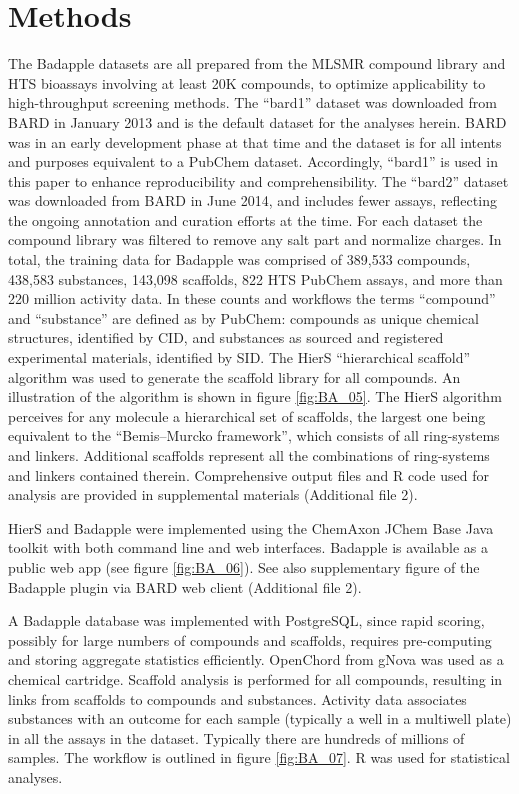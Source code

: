 \section{Methods}

The Badapple datasets are all prepared from the MLSMR compound library and HTS bioassays involving at least 20K compounds, to optimize applicability to high-throughput screening methods. The “bard1” dataset was downloaded from BARD in January 2013 and is the default dataset for the analyses herein. BARD was in an early development phase at that time and the dataset is for all intents and purposes equivalent to a PubChem dataset. Accordingly, “bard1” is used in this paper to enhance reproducibility and comprehensibility. The “bard2” dataset was downloaded from BARD in June 2014, and includes fewer assays, reflecting the ongoing annotation and curation efforts at the time. For each dataset the compound library was filtered to remove any salt part and normalize charges. In total, the training data for Badapple was comprised of 389,533 compounds, 438,583 substances, 143,098 scaffolds, 822 HTS PubChem assays, and more than 220 million activity data. In these counts and workflows the terms “compound” and “substance” are defined as by PubChem: compounds as unique chemical structures, identified by CID, and substances as sourced and registered experimental materials, identified by SID. The HierS “hierarchical scaffold” algorithm was used to generate the scaffold library for all compounds. An illustration of the algorithm is shown in figure \ref{fig:BA_05}. The HierS algorithm perceives for any molecule a hierarchical set of scaffolds, the largest one being equivalent to the “Bemis–Murcko framework”\cite{Bemis1996-jg}, which consists of all ring-systems and linkers. Additional scaffolds represent all the combinations of ring-systems and linkers contained therein. Comprehensive output files and R code used for analysis are provided in supplemental materials (Additional file 2).

HierS and Badapple were implemented using the ChemAxon JChem Base Java toolkit\cite{ChemAxon2012-py} with both command line and web interfaces. Badapple is available as a public web app (see figure \ref{fig:BA_06}). See also supplementary figure of the Badapple plugin via BARD web client (Additional file 2).

A Badapple database was implemented with PostgreSQL, since rapid scoring, possibly for large numbers of compounds and scaffolds, requires pre-computing and storing aggregate statistics efficiently. OpenChord from gNova was used as a chemical cartridge. Scaffold analysis is performed for all compounds, resulting in links from scaffolds to compounds and substances. Activity data associates substances with an outcome for each sample (typically a well in a multiwell plate) in all the assays in the dataset. Typically there are hundreds of millions of samples. The workflow is outlined in figure \ref{fig:BA_07}. R was used for statistical analyses.

